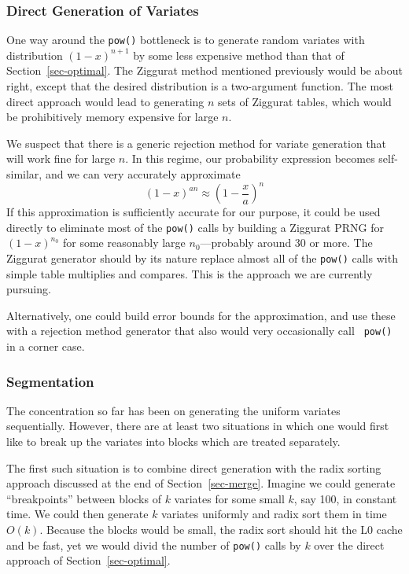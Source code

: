\documentclass[12pt]{article}
\begin{document}
\subsubsection{Direct Generation of Variates}

  One way around the {\tt pow()} bottleneck is to generate
  random variates with distribution $(1 - x)^{n + 1}$ by
  some less expensive method than that of
  Section~\ref{sec-optimal}.  The Ziggurat method mentioned
  previously would be about right, except that the desired
  distribution is a two-argument function.  The most direct
  approach would lead to generating $n$ sets of Ziggurat
  tables, which would be prohibitively memory expensive for
  large $n$.

  We suspect that there is a generic rejection method for
  variate generation that will work fine for large $n$. In
  this regime, our probability expression becomes
  self-similar, and we can very accurately approximate $$
    (1 - x)^{an} \approx \left(1 - \frac{x}{a}\right)^n
  $$
  If this approximation is sufficiently accurate for our
  purpose, it could be used directly to eliminate most
  of the {\tt pow()} calls by building a Ziggurat PRNG for
  $(1-x)^{n_0}$ for some reasonably large $n_0$---probably
  around 30 or more.  The Ziggurat generator should by its
  nature replace almost all of the {\tt pow()} calls with
  simple table multiplies and compares.  This is the
  approach we are currently pursuing.

  Alternatively, one could build error bounds for the
  approximation, and use these with a rejection method
  generator that also would very occasionally call {\tt
  pow()} in a corner case.

\subsubsection{Segmentation}\label{sec-segment}

  The concentration so far has been on generating the
  uniform variates sequentially.  However, there are at
  least two situations in which one would first like to
  break up the variates into blocks which are treated
  separately.

  The first such situation is to combine direct generation
  with the radix sorting approach discussed at the end of
  Section~\ref{sec-merge}.  Imagine we could generate
  ``breakpoints'' between blocks of $k$ variates for some
  small $k$, say 100, in constant time.  We could then
  generate $k$ variates uniformly and radix sort them in
  time $O(k)$.  Because the blocks would be small, the radix
  sort should hit the L0 cache and be fast, yet we would
  divid the number of {\tt pow()} calls by $k$ over the
  direct approach of Section~\ref{sec-optimal}.
\end{document}
